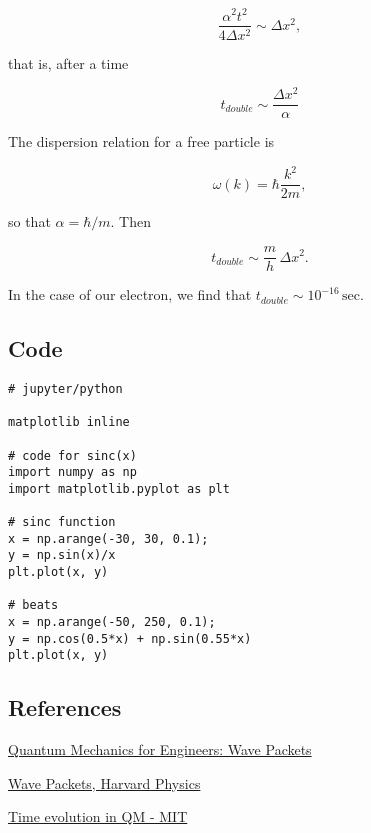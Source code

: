 \begin{equation}
\frac{\alpha^2 t^2}{4 \Delta x^2} \sim \Delta x^2,
\end{equation}

that is, after a time

\begin{equation}
t_{double} \sim \frac{\Delta x^2}{\alpha}
\end{equation}

The dispersion relation for a free particle is

\begin{equation}
  \omega(k) = \hbar \frac{k^2}{2m},
\end{equation}

so that $\alpha = \hbar/m$.  Then

\begin{equation}
t_{double} \sim \frac{m}{h}\, \Delta x^2 .
\end{equation}

In the case of our electron, we find that $t_{double} \sim 10^{-16}\,\text{sec}$.

\subsection{ Code}



\begin{verbatim}
# jupyter/python

matplotlib inline

# code for sinc(x)
import numpy as np
import matplotlib.pyplot as plt

# sinc function
x = np.arange(-30, 30, 0.1);
y = np.sin(x)/x
plt.plot(x, y)

# beats
x = np.arange(-50, 250, 0.1);
y = np.cos(0.5*x) + np.sin(0.55*x)
plt.plot(x, y)
\end{verbatim}



\subsection{References}

\href{https://www.eng.fsu.edu/~dommelen/quantum/style_a/packets.html}{Quantum Mechanics for Engineers: Wave Packets}

\href{https://users.physics.harvard.edu/~schwartz/15cFiles/Lecture11-WavePackets.pdf}{Wave Packets, Harvard Physics}

\href{https//ocw.mit.edu/courses/nuclear-engineering/22-02-introduction-to-applied-nuclear-physics-spring-2012/lecture-notes/MIT22_02S12_lec_ch6.pdf}{Time evolution in QM - MIT}
